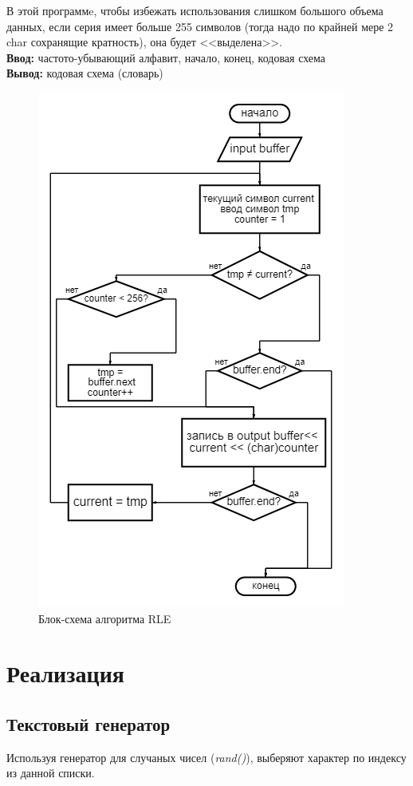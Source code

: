 \documentclass[12pt]{article} %
\begin{document}
В этой программe, чтобы избежать использования слишком большого объема данных, если серия имеет больше 255 символов (тогда надо по крайней мере 2 char сохранящие кратность), она будет <<выделена>>. \\
\textbf{Ввод: } частото-убывающий алфавит, начало, конец, кодовая схема\\
\textbf{Вывод: } кодовая схема (словарь)\\
\begin{figure}[H]
\centering \includegraphics[scale =0.75]{rle.png}
\caption{Блок-схема алгоритма RLE}
\end{figure}
\newpage
\section{Реализация}
\subsection{Текстовый генератор}
Используя генератор для случаных чисел (\textit{rand()}), выберяют характер по индексу из данной списки.  \\
\end{document}
